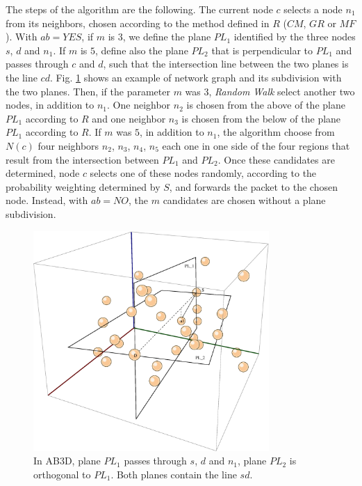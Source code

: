 \documentclass[journal,comsoc]{IEEEtran}
\begin{document}
The steps of the algorithm are the following. The current node \(c\) selects a node \(n_1\) from its neighbors, chosen according to the method defined in \(R\) (\(CM\), \(GR\) or \(MF\)). With \(ab = YES\), if \(m\) is \(3\), we define the plane \(PL_1\) identified by the three nodes \(s\), \(d\) and \(n_1\). If \(m\) is \(5\), define also the plane \(PL_2\) that is perpendicular to \(PL_1\) and passes through \(c\) and \(d\), such that the intersection line between the two planes is the line \(cd\). Fig. \ref{fig:ab3d} shows an example of network graph and its subdivision with the two planes.
Then, if the parameter \(m\) was \(3\), \emph{Random Walk} select another two nodes, in addition to \(n_1\). One neighbor \(n_2\) is chosen from the above of the plane \(PL_1\) according to \(R\) and one neighbor \(n_3\) is chosen from the below of the plane \(PL_1\) according to \(R\). If \(m\) was \(5\), in addition to \(n_1\), the algorithm choose from \(N(c)\) four neighbors \(n_2\), \(n_3\), \(n_4\), \(n_5\) each one in one side of the four regions that result from the intersection between \(PL_1\) and \(PL_2\). Once these candidates are determined, node \(c\) selects one of these nodes randomly, according to the probability weighting determined by \(S\), and forwards the packet to the chosen node.
Instead, with \(ab = NO\), the \(m\) candidates are chosen without a plane subdivision.

\begin{figure}
\centering
\includegraphics[width=0.8\textwidth]{images/ab3d}
\caption{In AB3D, plane \(PL_1\) passes through \(s\), \(d\) and \(n_1\), plane \(PL_2\) is orthogonal to \(PL_1\). Both planes contain the line \(sd\).}
  \label{fig:ab3d}
\end{figure}
\end{document}
